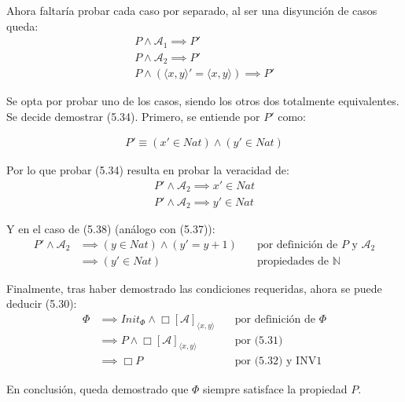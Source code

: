 Ahora faltaría probar cada caso por separado, al ser una disyunción de casos queda:
\begin{align}
    P \land \mathcal{A}_1 \implies P'\\
    P \land \mathcal{A}_2 \implies P'\\
    P \land (\langle x,y \rangle' = \langle x,y \rangle) \implies P'
\end{align}

Se opta por probar uno de los casos, siendo los otros dos totalmente equivalentes. Se decide demostrar (5.34). Primero, se entiende por $P'$ como:

\begin{align}
    P' \equiv (x' \in Nat) \land (y' \in Nat)
\end{align}

\noindent
Por lo que probar (5.34) resulta en probar la veracidad de:
\begin{align}
    P' \land \mathcal{A}_2 \implies x' \in Nat \\
    P' \land \mathcal{A}_2 \implies y' \in Nat
\end{align}

\noindent
Y en el caso de (5.38) (análogo con (5.37)):
\begin{equation*}
\begin{array}{rlr}
    P' \land \mathcal{A}_2 &\implies (y \in Nat) \land (y' = y + 1) & \quad \text{por definición de $P$ y $\mathcal{A}_2$}\\
    &\implies (y' \in Nat) & \quad \text{propiedades de $\mathbb{N}$}
\end{array}
\end{equation*}

Finalmente, tras haber demostrado las condiciones requeridas, ahora se puede deducir (5.30):
\begin{equation*}
\begin{array}{rlr}
    \Phi &\implies Init_{\Phi} \land \Box[\mathcal{A}]_{\langle x,y \rangle} & \quad \text{por definición de $\Phi$}\\
    &\implies P \land \Box[\mathcal{A}]_{\langle x,y \rangle} & \quad \text{por (5.31)}\\
    &\implies \Box P & \quad \text{por (5.32) y INV1}
\end{array}
\end{equation*}

\noindent
En conclusión, queda demostrado que $\Phi$ siempre satisface la propiedad $P$.